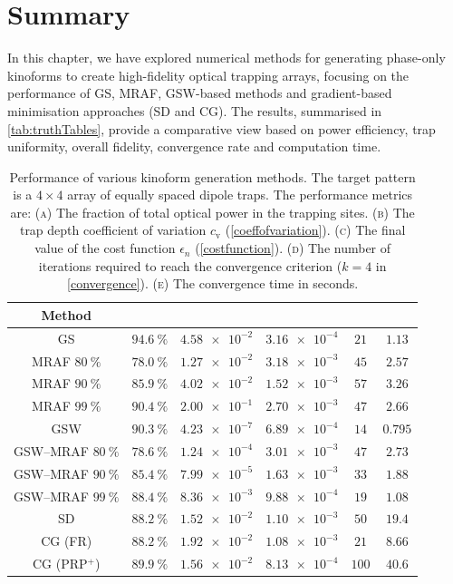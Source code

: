 \documentclass[../Thesis-IJspeert.tex]{subfiles}
\begin{document}
\section{Summary}
In this chapter, we have explored numerical methods for generating phase-only kinoforms to create high-fidelity optical trapping arrays, focusing on the performance of GS, MRAF, GSW-based methods and gradient-based minimisation approaches (SD and CG). The results, summarised in \autoref{tab:truthTables}, provide a comparative view based on power efficiency, trap uniformity, overall fidelity, convergence rate and computation time.
\begin{table}[h]
	\centering
	\begin{tabular}{cccccc}  
		\toprule
		Method & \sc{(a)} & \sc{(b)} &  \sc{(c)} & \sc{(d)} & \sc{(e)}\\
		\midrule
		GS&$\SI{94.6}{\percent}$&$\num{4.58e-2}$&$\num{3.16e-4}$&$21$&$1.13$\\
		MRAF $\SI{80}{\percent}$&$\SI{78.0}{\percent}$&$\num{1.27e-2}$& $\num{3.18e-3}$&$45$&$2.57$\\
		MRAF $\SI{90}{\percent}$&$\SI{85.9}{\percent} $&$\num{4.02e-2}$&$\num{1.52e-3}$&$57$&$3.26$\\
		MRAF $\SI{99}{\percent}$&$\SI{90.4}{\percent}$&$\num{2.00e-1}$&$\num{2.70e-3}$&$47$&$2.66$\\
		GSW&$\SI{90.3}{\percent}$& $\num{4.23e-7}$&$\num{6.89e-4}$&$14$&$0.795$\\
		GSW--MRAF $\SI{80}{\percent}$ &$\SI{78.6}{\percent} $&$\num{1.24e-4}$&$\num{3.01e-3}$&$47$&$2.73$\\
		GSW--MRAF $\SI{90}{\percent}$ &$\SI{85.4}{\percent} $&$\num{7.99e-5}$&$\num{1.63e-3}$&$33$&$1.88$ \\
		GSW--MRAF $\SI{99}{\percent}$ &$\SI{88.4}{\percent} $&$\num{8.36e-3}$ &$\num{9.88e-4} $& $19 $&$1.08$\\
		SD&$\SI{88.2}{\percent} $&$\num{1.52e-2}$ &$\num{1.10e-3} $& $50 $&$19.4$\\
		CG (FR)&$\SI{88.2}{\percent} $&$\num{1.92e-2}$ &$\num{1.08e-3} $& $21 $&$8.66$\\
		CG (PRP$^+$)&$\SI{89.9}{\percent} $&$\num{1.56e-2}$ &$\num{8.13e-4} $& $100 $&$40.6$\\
		\bottomrule
	\end{tabular}
	\caption[Performance metrics of various kinoform generation methods]{Performance of various kinoform generation methods. The target pattern is a $4\times4$ array of equally spaced dipole traps. The performance metrics are: \textsc{(a)} The fraction of total optical power in the trapping sites. \textsc{(b)} The trap depth coefficient of variation $c_\mathrm{v}$ (\autoref{coeffofvariation}). \textsc{(c)} The final value of the cost function $\epsilon_n$ (\autoref{costfunction}). \textsc{(d)} The number of iterations required to reach the convergence criterion ($k=4$ in \autoref{convergence}). \textsc{(e)} The convergence time in seconds.}
	\label{tab:truthTables}   
\end{table}
\end{document}
